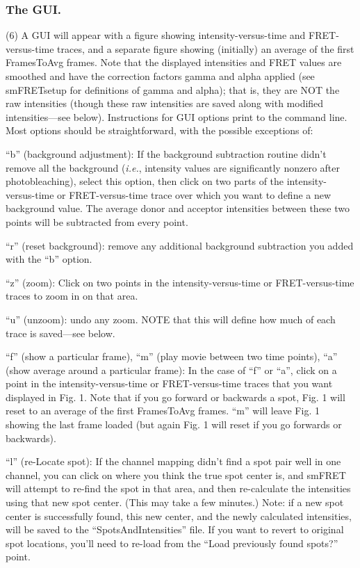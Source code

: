 \documentclass[11pt]{article}
\begin{document}
\subsubsection{The GUI.}\label{sec:GUI}

\noindent (6) A GUI will appear with a figure showing intensity-versus-time and FRET-versus-time traces, and a separate figure showing (initially) an average of the first FramesToAvg frames. Note that the displayed intensities and FRET values are smoothed and have the correction factors gamma and alpha applied (see smFRETsetup for definitions of gamma and alpha); that is, they are NOT the raw intensities (though these raw intensities are saved along with modified intensities---see below). Instructions for GUI options print to the command line. Most options should be straightforward, with the possible exceptions of:

``b'' (background adjustment): If the background subtraction routine didn't remove all the background ({\it i.e.}, intensity values are significantly nonzero after photobleaching), select this option, then click on two parts of the intensity-versus-time or FRET-versus-time trace over which you want to define a new background value. The average donor and acceptor intensities between these two points will be subtracted from every point. 

``r'' (reset background): remove any additional background subtraction you added with the ``b'' option.

``z'' (zoom): Click on two points in the intensity-versus-time or FRET-versus-time traces to zoom in on that area.

``u'' (unzoom): undo any zoom. NOTE that this will define how much of each trace is saved---see below.

``f'' (show a particular frame), ``m'' (play movie between two time points), ``a'' (show average around a particular frame): In the case of ``f'' or ``a'', click on a point in the intensity-versus-time or FRET-versus-time traces that you want displayed in Fig. 1.  Note that if you go forward or backwards a spot, Fig. 1 will reset to an average of the first FramesToAvg frames.  ``m'' will leave Fig. 1 showing the last frame loaded (but again Fig. 1 will reset if you go forwards or backwards).

``l'' (re-Locate spot): If the channel mapping didn't find a spot pair well in one channel, you can click on where you think the true spot center is, and smFRET will attempt to re-find the spot in that area, and then re-calculate the intensities using that new spot center. (This may take a few minutes.)  Note: if a new spot center is successfully found, this new center, and the newly calculated intensities, will be saved to the ``SpotsAndIntensities'' file.  If you want to revert to original spot locations, you'll need to re-load from the ``Load previously found spots?'' point. \\
\end{document}
